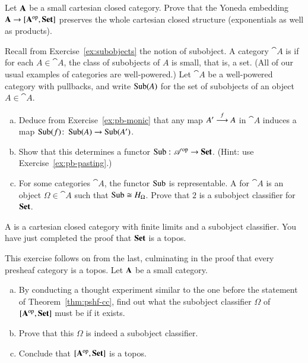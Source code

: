 \begin{question}
Let $\mathbf{A}$ be a small cartesian closed category.  Prove that the
Yoneda%
%
%
%
embedding $\mathbf{A} \to [\mathbf{A}^{\mathrm{op}},\mathbf{Set}]$ preserves the whole cartesian
closed structure (exponentials as well as products).
\end{question}


\begin{question}        
\label{ex:soc}
Recall from Exercise~\ref{ex:subobjects} the notion of subobject.  A 
category $\cat{A}$ is %
%
%
%
if for each $A \in \cat{A}$, the class of subobjects of $A$ is small, that
is, a set.  (All of our usual examples of categories are well-powered.)
Let $\cat{A}$ be a well-powered category with pullbacks, and write
$\operatorname{Sub}(A)$ for the set of subobjects of an object $A \in \cat{A}$.
% 
\begin{enumerate}[(b)]
\item
Deduce from Exercise~\ref{ex:pb-monic} that any map $A' \stackrel{f}{\longrightarrow} A$ in
$\cat{A}$ induces a map $\Sub(f)\from \Sub(A) \to \Sub(A')$.

\item 
Show that this determines a functor $\Sub\from \cat{A}^\op \to \Set$.
(Hint: use Exercise~\ref{ex:pb-pasting}.)

\item 
For some categories $\cat{A}$, the functor $\operatorname{Sub}$ is representable.  A
 for $\cat{A}$ is an object $\Omega \in
\cat{A}$ such that $\operatorname{Sub} \cong H_\Omega$.  Prove that $2$ is a subobject
classifier for $\mathbf{Set}$.
\end{enumerate}
% 
A %
%
%
is a cartesian closed category with finite limits and a subobject
classifier.  You have just completed the proof that $\mathbf{Set}$ is a topos.
\end{question}


\begin{question}        
\label{ex:pshf-topos}
This exercise follows on from the last, culminating in the proof that every
presheaf category%
%
%
is a topos.%
%
%
Let $\mathbf{A}$ be a small category.
% 
\begin{enumerate}[(b)]
\item
By conducting a thought%
%
%
experiment similar to the one before the statement of
Theorem~\ref{thm:pshf-cc}, find out what the subobject classifier $\Omega$
of $[\mathbf{A}^{\mathrm{op}},\mathbf{Set}]$ must be if it exists.

\item 
Prove that this $\Omega$ is indeed a subobject classifier.

\item 
Conclude that $[\mathbf{A}^{\mathrm{op}},\mathbf{Set}]$ is a topos.
\end{enumerate}
\end{question}


